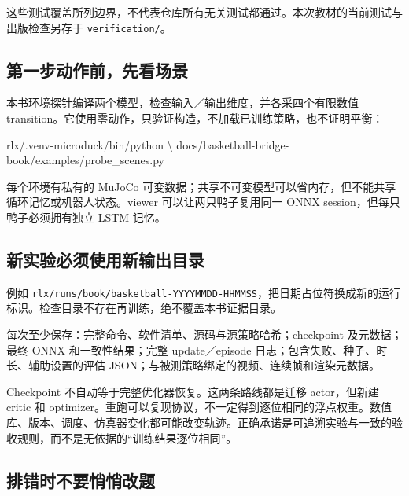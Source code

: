 \documentclass[
  chinese,
  11pt,
  letterpaper,
]{article}
\newenvironment{Shaded}{\begin{snugshade}}{\end{snugshade}}
\newcommand{\DataTypeTok}[1]{\textcolor[rgb]{0.13,0.29,0.53}{#1}}
\newcommand{\ExtensionTok}[1]{#1}
\newcommand{\NormalTok}[1]{#1}
\renewenvironment{Shaded}{\par\smallskip}{\par\smallskip}
\begin{document}
这些测试覆盖所列边界，不代表仓库所有无关测试都通过。本次教材的当前测试与出版检查另存于
\texttt{verifica\allowbreak{}tion/\allowbreak{}}。

\subsection{第一步动作前，先看场景}\label{ux7b2cux4e00ux6b65ux52a8ux4f5cux524dux5148ux770bux573aux666f}

本书环境探针编译两个模型，检查输入／输出维度，并各采四个有限数值
transition。它使用零动作，只验证构造，不加载已训练策略，也不证明平衡：

\begin{Shaded}
\begin{Highlighting}[]
\ExtensionTok{rlx/.venv{-}microduck/bin/python} \DataTypeTok{\textbackslash{}}
\NormalTok{  docs/basketball{-}bridge{-}book/examples/probe\_scenes.py}
\end{Highlighting}
\end{Shaded}

每个环境有私有的 MuJoCo
可变数据；共享不可变模型可以省内存，但不能共享循环记忆或机器人状态。viewer
可以让两只鸭子复用同一 ONNX session，但每只鸭子必须拥有独立 LSTM 记忆。

\subsection{新实验必须使用新输出目录}\label{ux65b0ux5b9eux9a8cux5fc5ux987bux4f7fux7528ux65b0ux8f93ux51faux76eeux5f55}

例如
\texttt{rlx/\allowbreak{}runs/\allowbreak{}book/\allowbreak{}basketba\allowbreak{}ll-\allowbreak{}YYYYMMDD\allowbreak{}-\allowbreak{}HHMMSS}，把日期占位符换成新的运行标识。检查目录不存在再训练，绝不覆盖本书证据目录。

每次至少保存：完整命令、软件清单、源码与源策略哈希；checkpoint
及元数据；最终 ONNX 和一致性结果；完整 update／episode
日志；包含失败、种子、时长、辅助设置的评估
JSON；与被测策略绑定的视频、连续帧和渲染元数据。

Checkpoint 不自动等于完整优化器恢复。这两条路线都是迁移 actor，但新建
critic 和
optimizer。重跑可以复现协议，不一定得到逐位相同的浮点权重。数值库、版本、调度、仿真器变化都可能改变轨迹。正确承诺是可追溯实验与一致的验收规则，而不是无依据的``训练结果逐位相同''。

\subsection{排错时不要悄悄改题}\label{ux6392ux9519ux65f6ux4e0dux8981ux6084ux6084ux6539ux9898}
\end{document}
